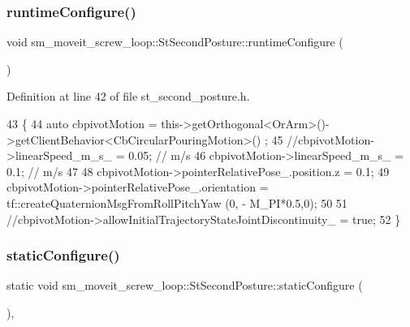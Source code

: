 \subsubsection{\texorpdfstring{runtime\+Configure()}{runtimeConfigure()}}
{\footnotesize\ttfamily void sm\+\_\+moveit\+\_\+screw\+\_\+loop\+::\+St\+Second\+Posture\+::runtime\+Configure (\begin{DoxyParamCaption}{ }\end{DoxyParamCaption})\hspace{0.3cm}{\ttfamily [inline]}}



Definition at line 42 of file st\+\_\+second\+\_\+posture.\+h.


\begin{DoxyCode}
43         \{
44             \textcolor{keyword}{auto} cbpivotMotion = this->getOrthogonal<OrArm>()->getClientBehavior<CbCircularPouringMotion>()
      ;
45             \textcolor{comment}{//cbpivotMotion->linearSpeed\_m\_s\_ = 0.05; // m/s}
46             cbpivotMotion->linearSpeed\_m\_s\_ = 0.1; \textcolor{comment}{// m/s}
47 
48             cbpivotMotion->pointerRelativePose\_.position.z = 0.1;
49             cbpivotMotion->pointerRelativePose\_.orientation = tf::createQuaternionMsgFromRollPitchYaw (0, -
       M\_PI*0.5,0);
50             
51             \textcolor{comment}{//cbpivotMotion->allowInitialTrajectoryStateJointDiscontinuity\_ = true;}
52         \}
\end{DoxyCode}
\mbox{\label{structsm__moveit__screw__loop_1_1StSecondPosture_a704c12b1f6ee40039fa1c6f1e3ec0ba4}} 
\subsubsection{\texorpdfstring{static\+Configure()}{staticConfigure()}}
{\footnotesize\ttfamily static void sm\+\_\+moveit\+\_\+screw\+\_\+loop\+::\+St\+Second\+Posture\+::static\+Configure (\begin{DoxyParamCaption}{ }\end{DoxyParamCaption})\hspace{0.3cm}{\ttfamily [inline]}, {\ttfamily [static]}}



